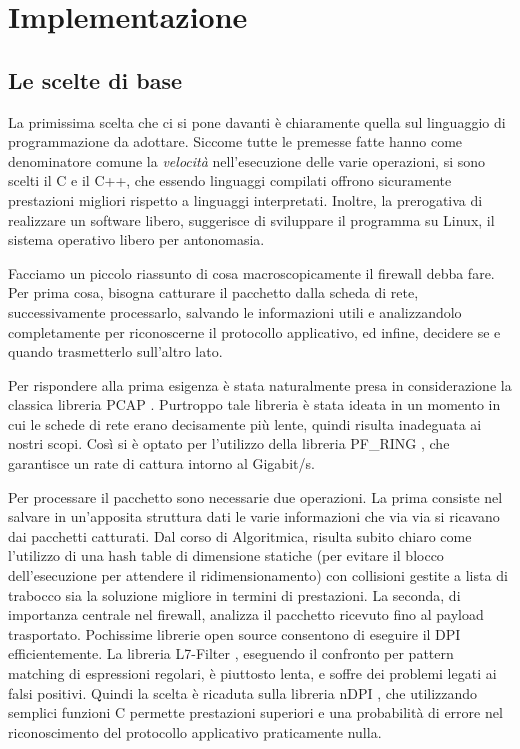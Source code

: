 \clearpage{\pagestyle{empty}\cleardoublepage}
\chapter{Implementazione}

\section{Le scelte di base}

La primissima scelta che ci si pone davanti è chiaramente quella sul linguaggio di programmazione da adottare. Siccome tutte le premesse fatte hanno come denominatore comune la \emph{velocità} nell'esecuzione delle varie operazioni, si sono scelti il C e il C++, che essendo linguaggi compilati offrono sicuramente prestazioni migliori rispetto a linguaggi interpretati. Inoltre, la prerogativa di realizzare un software libero, suggerisce di sviluppare il programma su Linux, il sistema operativo libero per antonomasia.

Facciamo un piccolo riassunto di cosa macroscopicamente il firewall debba fare. Per prima cosa, bisogna catturare il pacchetto dalla scheda di rete, successivamente processarlo, salvando le informazioni utili e analizzandolo completamente per riconoscerne il protocollo applicativo, ed infine, decidere se e quando trasmetterlo sull'altro lato.

Per rispondere alla prima esigenza è stata naturalmente presa in considerazione la classica libreria PCAP \cite{pcap,pcap2}. Purtroppo tale libreria è stata ideata in un momento in cui le schede di rete erano decisamente più lente, quindi risulta inadeguata ai nostri scopi. Così si è optato per l'utilizzo della libreria PF\_RING \cite{pfring}, che garantisce un rate di cattura intorno al Gigabit/s.

Per processare il pacchetto sono necessarie due operazioni. La prima consiste nel salvare in un'apposita struttura dati le varie informazioni che via via si ricavano dai pacchetti catturati. Dal corso di Algoritmica, risulta subito chiaro come l'utilizzo di una hash table di dimensione statiche (per evitare il blocco dell'esecuzione per attendere il ridimensionamento) con collisioni gestite a lista di trabocco sia la soluzione migliore in termini di prestazioni. La seconda, di importanza centrale nel firewall, analizza il pacchetto ricevuto fino al payload trasportato. Pochissime librerie open source consentono di eseguire il DPI efficientemente. La libreria L7-Filter \cite{l7filter}, eseguendo il confronto per pattern matching di espressioni regolari, è piuttosto lenta, e soffre dei problemi legati ai falsi positivi. Quindi la scelta è ricaduta sulla libreria nDPI \cite{ndpi}, che utilizzando semplici funzioni C permette prestazioni superiori e una probabilità di errore nel riconoscimento del protocollo applicativo praticamente nulla.


